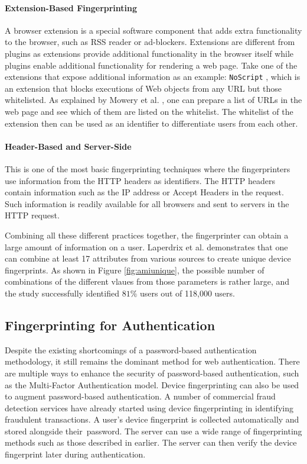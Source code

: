 \documentclass{acm_proc_article-sp}
\begin{document}
\paragraph{Extension-Based Fingerprinting}
A browser extension is a special software component that adds extra functionality to the browser, such as RSS reader or ad-blockers. Extensions are different from plugins as extensions provide additional functionality in the browser itself while plugins enable additional functionality for rendering a web page. Take one of the extensions that expose additional
information as an example: \verb|NoScript| \cite{noscript}, which is an extension that blocks executions of Web objects from any URL but those whitelisted. As explained by Mowery et al. \cite{mowery:fg}, one can prepare a list of URLs in the web page and see which of them are listed on the whitelist. The whitelist of the extension then can be used as an identifier to differentiate users from each other.

\paragraph{Header-Based and Server-Side}
This is one of the most basic fingerprinting techniques where the fingerprinters use information from the HTTP headers as identifiers. The HTTP headers contain information such as the IP address or Accept Headers in the request. Such information is readily available for all browsers and sent to  servers in the HTTP request.

Combining all these different practices together, the fingerprinter can obtain a large amount of information on a user.  Laperdrix et al. \cite{pierre:beauty} demonstrates that one can combine at least 17 attributes from various sources to create unique device fingerprints. As shown in Figure \ref{fig:amiunique}, the possible number of combinations of the different vlaues from those parameters is rather large, and the study successfully identified $81\%$ users out of 118,000 users.



\subsection{Fingerprinting for Authentication}
Despite the existing shortcomings of a password-based authentication methodology, it still remains the dominant method for web authentication. There are multiple ways to enhance the security of password-based authentication, such as the Multi-Factor Authentication model. Device fingerprinting can also be used to augment password-based authentication.
A number of commercial fraud detection services have already started using device fingerprinting in identifying fraudulent transactions.\cite{maxmind} \cite{parame} A user's device fingerprint is collected automatically and stored alongside their\ password.  The server can use a wide range of fingerprinting methods such as those described in earlier. The server can then verify the device fingerprint later during authentication.
\end{document}
